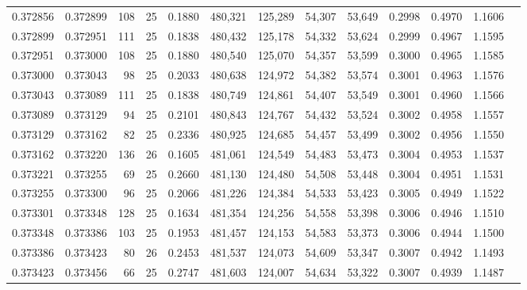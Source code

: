 \begin{tabular}{rrrrrrrrrrrrr}
0.372856 & 0.372899 &   108 &  25 &                                     0.1880 & 480,321 & 125,289 &  54,307 &  53,649 & 0.2998 & 0.4970 & 1.1606 \\
0.372899 & 0.372951 &   111 &  25 &                                     0.1838 & 480,432 & 125,178 &  54,332 &  53,624 & 0.2999 & 0.4967 & 1.1595 \\
0.372951 & 0.373000 &   108 &  25 &                                     0.1880 & 480,540 & 125,070 &  54,357 &  53,599 & 0.3000 & 0.4965 & 1.1585 \\
0.373000 & 0.373043 &    98 &  25 &                                     0.2033 & 480,638 & 124,972 &  54,382 &  53,574 & 0.3001 & 0.4963 & 1.1576 \\
0.373043 & 0.373089 &   111 &  25 &                                     0.1838 & 480,749 & 124,861 &  54,407 &  53,549 & 0.3001 & 0.4960 & 1.1566 \\
0.373089 & 0.373129 &    94 &  25 &                                     0.2101 & 480,843 & 124,767 &  54,432 &  53,524 & 0.3002 & 0.4958 & 1.1557 \\
0.373129 & 0.373162 &    82 &  25 &                                     0.2336 & 480,925 & 124,685 &  54,457 &  53,499 & 0.3002 & 0.4956 & 1.1550 \\
0.373162 & 0.373220 &   136 &  26 &                                     0.1605 & 481,061 & 124,549 &  54,483 &  53,473 & 0.3004 & 0.4953 & 1.1537 \\
0.373221 & 0.373255 &    69 &  25 &                                     0.2660 & 481,130 & 124,480 &  54,508 &  53,448 & 0.3004 & 0.4951 & 1.1531 \\
0.373255 & 0.373300 &    96 &  25 &                                     0.2066 & 481,226 & 124,384 &  54,533 &  53,423 & 0.3005 & 0.4949 & 1.1522 \\
0.373301 & 0.373348 &   128 &  25 &                                     0.1634 & 481,354 & 124,256 &  54,558 &  53,398 & 0.3006 & 0.4946 & 1.1510 \\
0.373348 & 0.373386 &   103 &  25 &                                     0.1953 & 481,457 & 124,153 &  54,583 &  53,373 & 0.3006 & 0.4944 & 1.1500 \\
0.373386 & 0.373423 &    80 &  26 &                                     0.2453 & 481,537 & 124,073 &  54,609 &  53,347 & 0.3007 & 0.4942 & 1.1493 \\
0.373423 & 0.373456 &    66 &  25 &                                     0.2747 & 481,603 & 124,007 &  54,634 &  53,322 & 0.3007 & 0.4939 & 1.1487 \\

\end{tabular}

